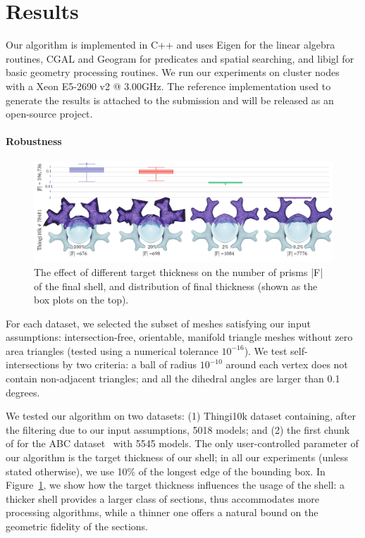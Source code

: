 \section{Results}
\label{prism:sec:results}
Our algorithm is implemented in C++ and uses Eigen \cite{eigenweb} for the linear algebra routines, CGAL {\cite{cgal2008computational}} and Geogram \cite{levy2015geogram} for predicates and spatial searching, and libigl \cite{jacobson2016libigl} for basic geometry processing routines.
We run our experiments on cluster nodes with a Xeon E5-2690 v2 @ 3.00GHz.
The reference implementation used to generate the results is attached to the submission and will be released as an open-source project.

\paragraph{Robustness}

\begin{figure}
    \centering
    \includegraphics[width=\linewidth,draft=false]{prism-tex/figs/varying_thickness}
    \caption{The effect of different target thickness on the number of prisms |F| of the final shell, 
    and distribution of final thickness ({shown as the box plots on the} top).} 
    
    \label{prism:fig:vary_thick}
\end{figure}

For each dataset, we selected the subset of meshes satisfying our input assumptions:  intersection-free, orientable, manifold triangle meshes without zero area triangles (tested using a numerical tolerance $10^{-16}$).  We test self-intersections by two criteria: a ball of radius $10^{-10}$ around each vertex does not contain non-adjacent triangles; and all the dihedral angles are larger than 0.1 degrees.

We tested our algorithm on two datasets: (1) Thingi10k dataset \cite{zhou2016thingi10k} containing, after the filtering due to our input assumptions, 5018 models; and (2) the first chunk of for the ABC dataset~\cite{koch2019abc} with 5545 models.
The only user-controlled parameter of our algorithm is the target thickness of our shell; in all our experiments (unless stated otherwise), we use 10\% of the longest edge of the bounding box. 
In Figure~\ref{prism:fig:vary_thick}, we show how the target thickness influences the usage of the shell: a thicker shell provides a larger class of sections, thus accommodates more processing algorithms, while a thinner one offers a natural bound on the geometric fidelity of the sections.

